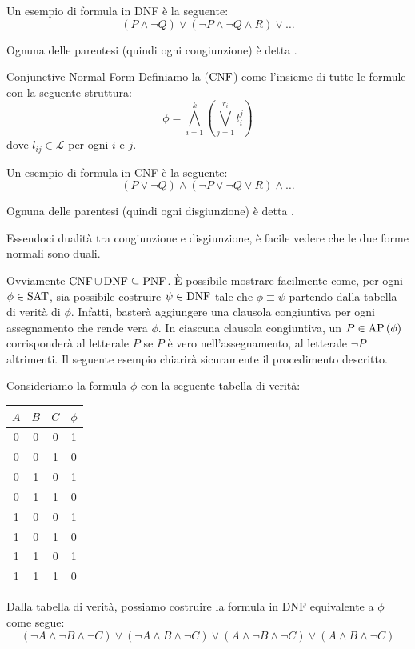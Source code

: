 \begin{example}{}
  Un esempio di formula in DNF è la seguente:
  \[(P\land \neg Q) \lor (\neg P \land \neg Q \land R) \lor \ldots\]

  Ognuna delle parentesi (quindi ogni congiunzione) è detta .
\end{example}

\begin{definition}{Conjunctive Normal Form}
  Definiamo la  (\(\operatorname{CNF}\)) come l'insieme di tutte le formule con la seguente struttura:
  \[\phi = \bigwedge_{i=1}^k\left(\bigvee_{j=1}^{r_i} l_i^j\right)\]
  dove \(l_{ij} \in \mathcal{L}\) per ogni \(i\) e \(j\).
\end{definition}

\begin{example}{}
  Un esempio di formula in CNF è la seguente:
  \[(P\lor \neg Q) \land (\neg P \lor \neg Q \lor R) \land \ldots\]

  Ognuna delle parentesi (quindi ogni disgiunzione) è detta .
\end{example}

Essendoci dualità tra congiunzione e disgiunzione, è facile vedere che le due forme normali sono duali.

Ovviamente \(\operatorname{CNF} \cup \operatorname{DNF} \subseteq \operatorname{PNF}\). È possibile mostrare facilmente come, per ogni \(\phi \in \Sat\), sia possibile costruire \(\psi \in \operatorname{DNF}\) tale che \(\phi \equiv \psi\) partendo dalla tabella di verità di \(\phi\).
Infatti, basterà aggiungere una clausola congiuntiva per ogni assegnamento che rende vera \(\phi\).
In ciascuna clausola congiuntiva, un \(P\in \AP[\phi]\) corrisponderà al letterale \(P\) se \(P\) è vero nell'assegnamento, al letterale \(\neg P\) altrimenti.
Il seguente esempio chiarirà sicuramente il procedimento descritto.

\begin{example}{}
  Consideriamo la formula \(\phi \) con la seguente tabella di verità:

  \begin{center}
    \begin{tabular}{ccc|c}
      \(A\) & \(B\) & \(C\) & \(\phi\)\\
      \hline
      0 & 0 & 0 & 1\\
      0 & 0 & 1 & 0\\
      0 & 1 & 0 & 1\\
      0 & 1 & 1 & 0\\
      1 & 0 & 0 & 1\\
      1 & 0 & 1 & 0\\
      1 & 1 & 0 & 1\\
      1 & 1 & 1 & 0\\
    \end{tabular}
  \end{center}

  Dalla tabella di verità, possiamo costruire la formula in DNF equivalente a \(\phi\) come segue:
  \[(\neg A \land \neg B \land \neg C) \lor (\neg A \land B \land \neg C) \lor (A \land \neg B \land \neg C) \lor (A \land B \land \neg C)\]
  
\end{example}

